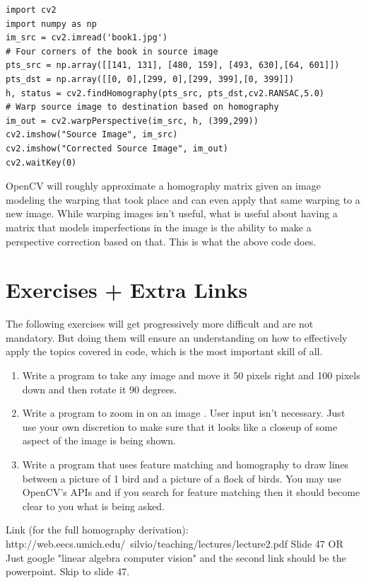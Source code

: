 \documentclass{article}
\begin{document}
\begin{lstlisting}
import cv2
import numpy as np
im_src = cv2.imread('book1.jpg')
# Four corners of the book in source image
pts_src = np.array([[141, 131], [480, 159], [493, 630],[64, 601]])
pts_dst = np.array([[0, 0],[299, 0],[299, 399],[0, 399]])
h, status = cv2.findHomography(pts_src, pts_dst,cv2.RANSAC,5.0)
# Warp source image to destination based on homography
im_out = cv2.warpPerspective(im_src, h, (399,299))
cv2.imshow("Source Image", im_src)
cv2.imshow("Corrected Source Image", im_out)
cv2.waitKey(0)
\end{lstlisting}
OpenCV will roughly approximate a homography matrix given an image
modeling the warping that took place and can even apply that same warping to a new image. While warping images isn't useful, what is useful about having a matrix that models imperfections in the image is the ability to make a perspective correction based on that. This is what the above code does.

\section{Exercises + Extra Links}
The following exercises will get progressively more difficult and are not mandatory. But doing them will ensure an understanding on how to effectively apply the topics covered in code, which is the most important skill of all.
\begin{enumerate}
  \item Write a program to take any image and move it 50 pixels right and 100 pixels down and then rotate it 90 degrees.
  \item Write a program to zoom in on an image . User input isn't necessary. Just use your own discretion to make sure that it looks like a closeup of some aspect of the image is being shown. 
  \item Write a program that uses feature matching and homography to draw lines between a picture of 1 bird and a picture of a flock of birds. You may use OpenCV's APIs and if you search for feature matching then it should become clear to you what is being asked.
\end{enumerate}
Link (for the full homography derivation):
http://web.eecs.umich.edu/~silvio/teaching/lectures/lecture2.pdf
Slide 47 OR Just google "linear algebra computer vision" and the second link should be the powerpoint. Skip to slide 47.
\end{document}
